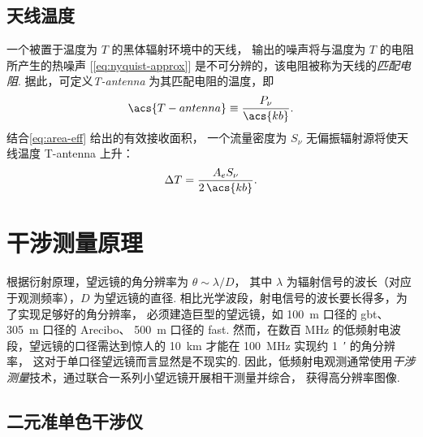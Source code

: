 \subsection{天线温度}

一个被置于温度为 $T$ 的黑体辐射环境中的天线，
输出的噪声将与温度为 $T$ 的电阻所产生的热噪声 [\autoref{eq:nyquist-approx}]
是不可分辨的，该电阻被称为天线的\emph{匹配电阻}.
据此，可定义\emph{\ac{T-antenna}} 为其匹配电阻的温度，即
\begin{equation}
  \label{eq:t-ant}
  \acs{T-antenna} \equiv \frac{P_{\nu}}{\acs{kb}} .
\end{equation}
结合\autoref{eq:area-eff} 给出的有效接收面积，
一个流量密度为 $S_{\nu}$ 无偏振辐射源将使天线温度 \acs{T-antenna} 上升：
\begin{equation}
  \label{eq:dt-source}
  \Delta T = \frac{A_e S_{\nu}}{2\,\acs{kb}} .
\end{equation}


\section{干涉测量原理}
\label{sec:interferometry}

根据衍射原理，望远镜的角分辨率为 $\theta \sim \lambda / D$，
其中 $\lambda$ 为辐射信号的波长（对应于观测频率），$D$ 为望远镜的直径.
相比光学波段，射电信号的波长要长得多，为了实现足够好的角分辨率，
必须建造巨型的望远镜，如 \SI{100}{\meter} 口径的 \ac{gbt}、
\SI{305}{\meter} 口径的 Arecibo、
\SI{500}{\meter} 口径的 \ac{fast}.
然而，在数百 \si{\MHz} 的低频射电波段，望远镜的口径需达到惊人的 \SI{10}{\km}
才能在 \SI{100}{\MHz} 实现约 \SI{1}{\arcminute} 的角分辨率，
这对于单口径望远镜而言显然是不现实的.
因此，低频射电观测通常使用\emph{干涉测量}技术，通过联合一系列小望远镜开展相干测量并综合，
获得高分辨率图像.

\subsection{二元准单色干涉仪}

